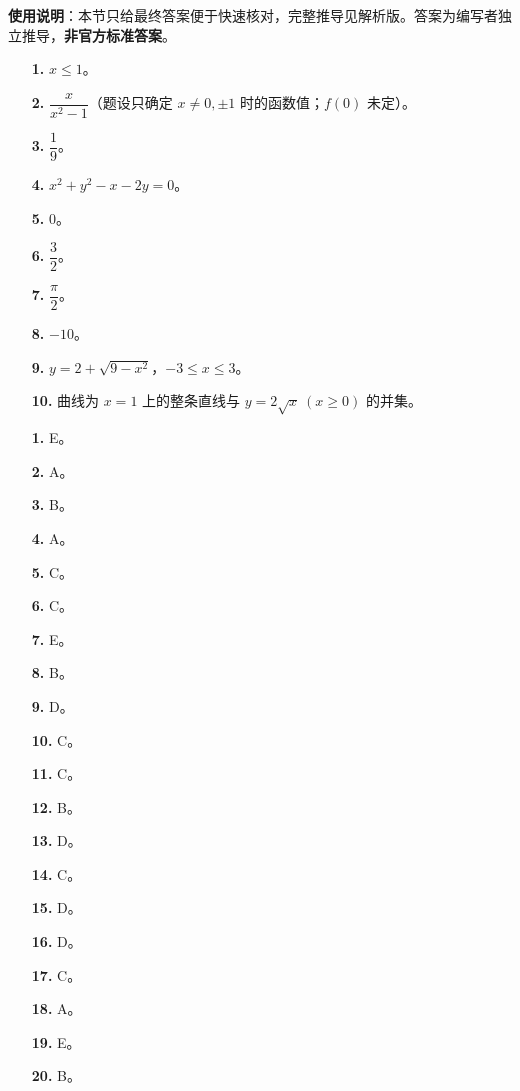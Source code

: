 
\begin{gknotice}
\textbf{使用说明}：本节只给最终答案便于快速核对，完整推导见解析版。答案为编写者独立推导，\textbf{非官方标准答案}。
\end{gknotice}

\begin{itemize}[leftmargin=2.6em]
  \item[\textbf{1.}] $x\leq1$。
  \item[\textbf{2.}] $\dfrac{x}{x^2-1}$（题设只确定 $x\ne0,\pm1$ 时的函数值；$f(0)$ 未定）。
  \item[\textbf{3.}] $\dfrac19$。
  \item[\textbf{4.}] $x^2+y^2-x-2y=0$。
  \item[\textbf{5.}] $0$。
  \item[\textbf{6.}] $\dfrac32$。
  \item[\textbf{7.}] $\dfrac\pi2$。
  \item[\textbf{8.}] $-10$。
  \item[\textbf{9.}] $y=2+\sqrt{9-x^2}$，$-3\leq x\leq3$。
  \item[\textbf{10.}] 曲线为 $x=1$ 上的整条直线与 $y=2\sqrt x\ (x\geq0)$ 的并集。
\end{itemize}

\begin{itemize}[leftmargin=2.6em]
  \item[\textbf{1.}] E。
  \item[\textbf{2.}] A。
  \item[\textbf{3.}] B。
  \item[\textbf{4.}] A。
  \item[\textbf{5.}] C。
  \item[\textbf{6.}] C。
  \item[\textbf{7.}] E。
  \item[\textbf{8.}] B。
  \item[\textbf{9.}] D。
  \item[\textbf{10.}] C。
  \item[\textbf{11.}] C。
  \item[\textbf{12.}] B。
  \item[\textbf{13.}] D。
  \item[\textbf{14.}] C。
  \item[\textbf{15.}] D。
  \item[\textbf{16.}] D。
  \item[\textbf{17.}] C。
  \item[\textbf{18.}] A。
  \item[\textbf{19.}] E。
  \item[\textbf{20.}] B。
\end{itemize}

